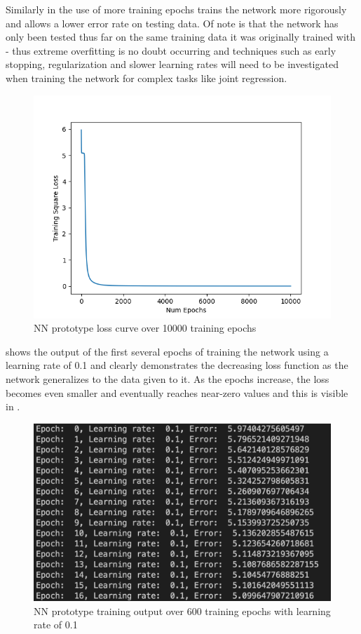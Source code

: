 Similarly in  the use of more training epochs trains the network more rigorously and allows a lower error rate on testing data. Of note is that the network has only been tested thus far on the same training data it was originally trained with - thus extreme overfitting is no doubt occurring and techniques such as early stopping, regularization and slower learning rates will need to be investigated when training the network for complex tasks like joint regression.

\begin{figure}[h]
    \centering
    \includegraphics[width=0.6\linewidth]{figures/NN_prototype_10000_epochs.png}
    \caption{NN prototype loss curve over 10000 training epochs}
    \label{fig:NN_prototype_10000_epochs}
\end{figure}

 shows the output of the first several epochs of training the network using a learning rate of 0.1 and clearly demonstrates the decreasing loss function as the network generalizes to the data given to it. As the epochs increase, the loss becomes even smaller and eventually reaches near-zero values and this is visible in .

\begin{figure}[h]
    \centering
    \includegraphics[width=0.7\linewidth]{figures/NN_prototype_lrate_0.1_600_epochs.png}
    \caption{NN prototype training output over 600 training epochs with learning rate of 0.1}
    \label{fig:NN_prototype_lrate_0.1_600_epochs}
\end{figure}

